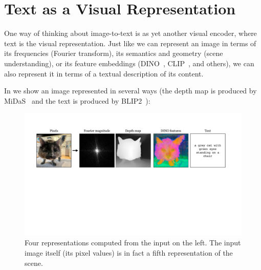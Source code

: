 \section{Text as a Visual Representation}

One way of thinking about image-to-text is as yet another visual encoder, where text is the visual representation. Just like we can represent an image in terms of its frequencies (Fourier transform), its semantics and geometry (scene understanding), or its feature embeddings (DINO~\cite{caron2021emerging}, CLIP~\cite{radford2021learning}, and others), we can also represent it in terms of a textual description of its content.



In \fig{\ref{fig:vision_and_language:different_visual_representations}} we show an image represented in several ways (the depth map is produced by MiDaS~\cite{Ranftl2022} and the text is produced by BLIP2~\cite{li2023blip2}):
\begin{figure}[h!]
    \centerline{
    \includegraphics[width=1.0\linewidth]{figures/vision_and_language/different_visual_representations.pdf}
    }
    \caption{Four representations computed from the input on the left. The input image itself (its pixel values) is in fact a fifth representation of the scene.}
    \label{fig:vision_and_language:different_visual_representations}
\end{figure}


